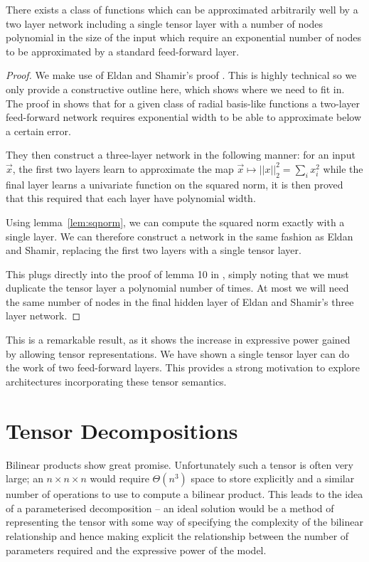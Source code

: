 \begin{thm}
There exists a class of functions which can be approximated arbitrarily well by a two layer network
including a single tensor layer with a number of nodes polynomial in the size of the input which
require an exponential number of nodes to be approximated by a standard feed-forward layer.
\end{thm}
\begin{proof}
We make use of Eldan and Shamir's proof \autocite{Eldan2016}. This is highly technical so we only
provide a constructive outline here, which shows where we need to fit in. The proof in
\autocite{Eldan2016} shows that for a given class of radial basis-like functions a two-layer
feed-forward network requires exponential width to be able to approximate below a certain error.

They then construct a three-layer network in the following manner:
for an input \(\vec{x}\), the first two layers learn to approximate the map 
\(\vec{x}\mapsto ||x||^2_2 = \sum_i x_i^2\) while the final layer learns a univariate function on the
squared norm, it is then proved that this required that each layer have polynomial width.

Using lemma~\ref{lem:sqnorm}, we can compute the squared norm exactly
with a single layer. We can therefore construct a network in
the same fashion as Eldan and Shamir, replacing the first two layers with a single tensor layer. 

This plugs directly into the proof of lemma 10 in \autocite[18--19]{Eldan2016}, simply noting that
we must duplicate the tensor layer a polynomial number of times. At most we will need the same number of
nodes in the final hidden layer of Eldan and Shamir's three layer network.
\end{proof}

This is a remarkable result, as it shows the increase in expressive power gained by allowing
tensor representations. We have shown a single tensor layer can do the work of two feed-forward
layers. This provides a strong motivation to explore architectures incorporating these tensor
semantics.


\section{Tensor Decompositions} %
Bilinear products show great promise. Unfortunately
such a tensor is often very large; an \(n \times n \times n\) would require \(\Theta(n^3)\) space
to store explicitly and a similar number of operations to use to compute a bilinear product. 
This leads to the idea of a parameterised decomposition -- an ideal solution
would be a method of representing the tensor with some way of specifying the complexity of the
bilinear relationship and hence making explicit the relationship between the number of parameters
required and the expressive power of the model. 

